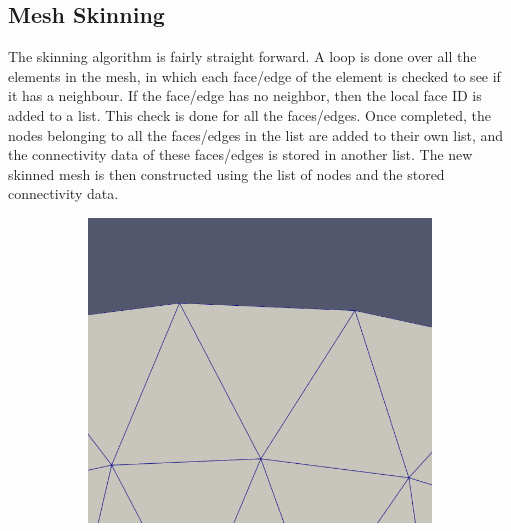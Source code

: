 \documentclass[12pt, letterpaper]{article}
\begin{document}
\subsection{Mesh Skinning}
The skinning algorithm is fairly straight forward. A loop is done over all the elements in the mesh, in which each face/edge of the element is checked to see if it has a neighbour. If the face/edge has no neighbor, then the local face ID is added to a list. This check is done for all the faces/edges. Once completed, the nodes belonging to all the faces/edges in the list are added to their own list, and the connectivity data of these faces/edges is stored in another list. The new skinned mesh is then constructed using the list of nodes and the stored connectivity data.
\begin{figure}[ht]
    \begin{subfigure}{0.48\textwidth}
    	\includegraphics[width=\linewidth]{circleNeighbExample.png}
    \end{subfigure}
    \hspace*{\fill}
    \begin{subfigure}{0.48\textwidth}

\end{subfigure}
\end{figure}
\end{document}
